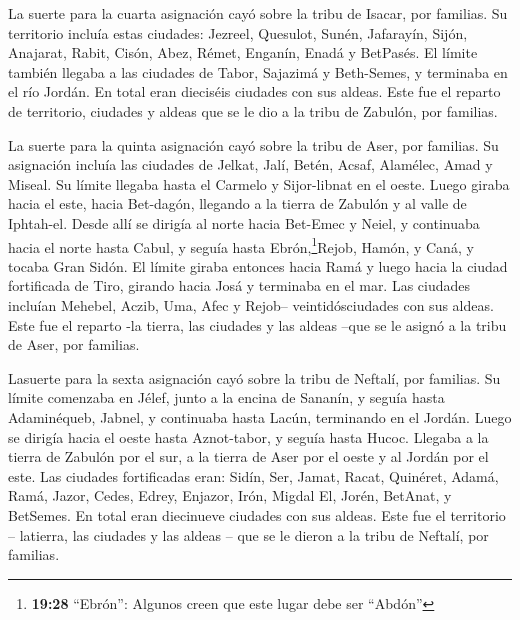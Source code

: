  La suerte para la cuarta asignación cayó sobre la tribu de
Isacar, por familias.  Su territorio incluía estas
ciudades: Jezreel, Quesulot, Sunén,  Jafarayín, Sijón,
Anajarat,  Rabit, Cisón, Abez,  Rémet,
Enganín, Enadá y BetPasés.  El límite también llegaba a las
ciudades de Tabor, Sajazimá y Beth-Semes, y terminaba en el río Jordán.
En total eran dieciséis ciudades con sus aldeas.  Este fue
el reparto de territorio, ciudades y aldeas que se le dio a la tribu de
Zabulón, por familias.

 La suerte para la quinta asignación cayó sobre la tribu de
Aser, por familias.  Su asignación incluía las ciudades de
Jelkat, Jalí, Betén, Acsaf,  Alamélec, Amad y Miseal. Su
límite llegaba hasta el Carmelo y Sijor-libnat en el oeste.
 Luego giraba hacia el este, hacia Bet-dagón, llegando a la
tierra de Zabulón y al valle de Iphtah-el. Desde allí se dirigía al
norte hacia Bet-Emec y Neiel, y continuaba hacia el norte hasta Cabul, y
seguía hasta  Ebrón,\footnote{\textbf{19:28} ``Ebrón'':
  Algunos creen que este lugar debe ser ``Abdón''}Rejob, Hamón, y Caná,
y tocaba Gran Sidón.  El límite giraba entonces hacia Ramá
y luego hacia la ciudad fortificada de Tiro, girando hacia Josá y
terminaba en el mar. Las ciudades incluían Mehebel, Aczib, 
Uma, Afec y Rejob-- veintidósciudades con sus aldeas.  Este
fue el reparto -la tierra, las ciudades y las aldeas --que se le asignó
a la tribu de Aser, por familias.

 Lasuerte para la sexta asignación cayó sobre la tribu de
Neftalí, por familias.  Su límite comenzaba en Jélef, junto
a la encina de Sananín, y seguía hasta Adaminéqueb, Jabnel, y continuaba
hasta Lacún, terminando en el Jordán.  Luego se dirigía
hacia el oeste hasta Aznot-tabor, y seguía hasta Hucoc. Llegaba a la
tierra de Zabulón por el sur, a la tierra de Aser por el oeste y al
Jordán por el este.  Las ciudades fortificadas eran: Sidín,
Ser, Jamat, Racat, Quinéret,  Adamá, Ramá, Jazor,
 Cedes, Edrey, Enjazor,  Irón, Migdal El,
Jorén, BetAnat, y BetSemes. En total eran diecinueve ciudades con sus
aldeas.  Este fue el territorio -- latierra, las ciudades y
las aldeas -- que se le dieron a la tribu de Neftalí, por familias.

